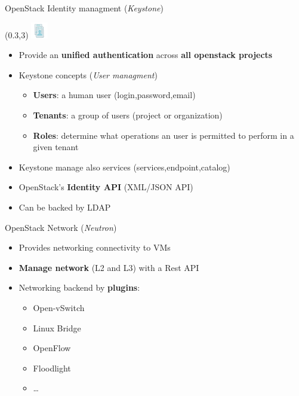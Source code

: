 \begin{frame}{OpenStack Identity managment (\textsl{Keystone})}
  \begin{textblock}{}(0.3,3)
    \includegraphics[width=2em]{img/identity-service}
  \end{textblock}
  \begin{itemize}
    \item Provide an \textbf{unified authentication} across \textbf{all openstack projects}
      \medskip
    \item Keystone concepts (\textsl{User managment})
      \medskip
      \begin{itemize}
        \item \textbf{Users}: a human user (login,password,email)
          \medskip
        \item \textbf{Tenants}: a group of users (project or organization)
          \medskip
        \item \textbf{Roles}: determine what operations an user is permitted to perform in a given tenant
          \medskip
      \end{itemize}
    \item Keystone manage also services (services,endpoint,catalog)
      \medskip
    \item OpenStack’s \textbf{Identity API} (XML/JSON API)
      \medskip
    \item Can be backed by LDAP
  \end{itemize}
\end{frame}

\begin{frame}{OpenStack Network (\textsl{Neutron})}
  \begin{itemize}
    \item Provides networking connectivity to VMs
      \medskip
    \item \textbf{Manage network} (L2 and L3) with a Rest API
      \medskip
    \item Networking backend by \textbf{plugins}:
      \medskip
      \begin{itemize}
        \item Open-vSwitch
      \medskip
        \item Linux Bridge
      \medskip
        \item OpenFlow
      \medskip
        \item Floodlight
      \medskip
        \item …
      \end{itemize}
  \end{itemize}
\end{frame}


